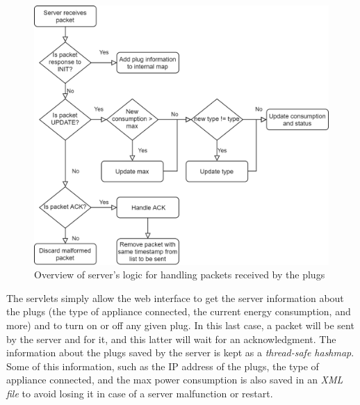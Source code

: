 \documentclass[conference]{IEEEtran}
\begin{document}
	\begin{figure}
		\centering
		\includegraphics[width=\linewidth]{assets/server_logic}
		\caption{Overview of server's logic for handling packets received by the plugs}
		\label{fig:server_logic}
	\end{figure}
	The servlets simply allow the web interface to get the server information about the plugs (the type of appliance connected, the current energy consumption, and more) and to turn on or off any given plug. In this last case, a packet will be sent by the server and for it, and this latter will wait for an acknowledgment. The information about the plugs saved by the server is kept as a \textit{thread-safe hashmap}. Some of this information, such as the IP address of the plugs, the type of appliance connected, and the max power consumption is also saved in an \textit{XML file} to avoid losing it in case of a server malfunction or restart.
	
\end{document}
